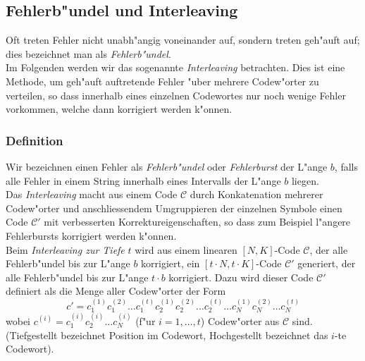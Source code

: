 \documentclass[german, 10pt, a4paper, twocolumn]{scrartcl}
\begin{document}
\subsection{Fehlerb"undel und Interleaving}

Oft treten Fehler nicht unabh"angig voneinander auf, sondern treten geh"auft auf; dies bezeichnet man als \textit{Fehlerb"undel}.\\
Im Folgenden werden wir das sogenannte \textit{Interleaving} betrachten. Dies ist eine Methode, um geh"auft auftretende Fehler "uber mehrere Codew"orter zu verteilen, so dass innerhalb eines einzelnen Codewortes nur noch wenige Fehler vorkommen, welche dann korrigiert werden k"onnen.

\subsubsection{Definition}

Wir bezeichnen einen Fehler als \textit{Fehlerb"undel} oder \textit{Fehlerburst} der L"ange $b$, falls alle Fehler in einem String innerhalb eines Intervalls der L"ange $b$ liegen.\\
Das \textit{Interleaving} macht aus einem Code $\mathcal{C}$ durch Konkatenation mehrerer Codew"orter und anschliessendem Umgruppieren der einzelnen Symbole einen Code $\mathcal{C}'$ mit verbesserten Korrektureigenschaften, so dass zum Beispiel l"angere Fehlerbursts korrigiert werden k"onnen.\\
Beim \textit{Interleaving zur Tiefe} $t$ wird aus einem linearen $[N,K]$-Code $\mathcal{C}$, der alle Fehlerb"undel bis zur L"ange $b$ korrigiert, ein $[t\cdotp N,t\cdotp K]$-Code $\mathcal{C}'$ generiert, der alle Fehlerb"undel bis zur L"ange $t\cdotp b$ korrigiert. Dazu wird dieser Code $\mathcal{C}'$  definiert als die Menge aller Codew"orter der Form
\begin{displaymath}
	c' = c_1^{(1)}c_1^{(2)}\hdots c_1^{(t)}c_2^{(1)}c_2^{(2)}\hdots c_2^{(t)}\hdots c_N^{(1)}c_N^{(2)}\hdots c_N^{(t)}
\end{displaymath}
wobei $c^{(i)}=c_1^{(i)}c_2^{(i)}\hdots c_N^{(i)}$ (f"ur $i=1,\ldots,t$) Codew"orter aus $\mathcal{C}$ sind. (Tiefgestellt bezeichnet Position im Codewort, Hochgestellt bezeichnet das $i$-te Codewort).

%
\end{document}
